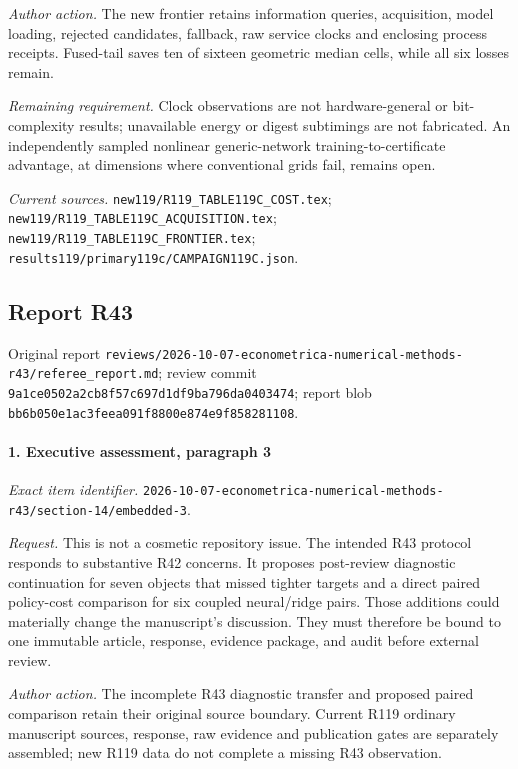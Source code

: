 \par\emph{Author action.} The new frontier retains information queries, acquisition, model loading, rejected candidates, fallback, raw service clocks and enclosing process receipts. Fused-tail saves ten of sixteen geometric median cells, while all six losses remain.

\par\emph{Remaining requirement.} Clock observations are not hardware-general or bit-complexity results; unavailable energy or digest subtimings are not fabricated. An independently sampled nonlinear generic-network training-to-certificate advantage, at dimensions where conventional grids fail, remains open.

\par\emph{Current sources.} \nolinkurl{new119/R119_TABLE119C_COST.tex}; \nolinkurl{new119/R119_TABLE119C_ACQUISITION.tex}; \nolinkurl{new119/R119_TABLE119C_FRONTIER.tex}; \nolinkurl{results119/primary119c/CAMPAIGN119C.json}.

\subsection{Report R43}

Original report \nolinkurl{reviews/2026-10-07-econometrica-numerical-methods-r43/referee_report.md}; review commit \nolinkurl{9a1ce0502a2cb8f57c697d1df9ba796da0403474}; report blob \nolinkurl{bb6b050e1ac3feea091f8800e874e9f858281108}.

\paragraph{1. Executive assessment, paragraph 3}

\emph{Exact item identifier.} \nolinkurl{2026-10-07-econometrica-numerical-methods-r43/section-14/embedded-3}.

\par\emph{Request.} This is not a cosmetic repository issue. The intended R43 protocol responds to substantive R42 concerns. It proposes post-review diagnostic continuation for seven objects that missed tighter targets and a direct paired policy-cost comparison for six coupled neural/\allowbreak{}ridge pairs. Those additions could materially change the manuscript’s discussion. They must therefore be bound to one immutable article, response, evidence package, and audit before external review.

\par\emph{Author action.} The incomplete R43 diagnostic transfer and proposed paired comparison retain their original source boundary. Current R119 ordinary manuscript sources, response, raw evidence and publication gates are separately assembled; new R119 data do not complete a missing R43 observation.

